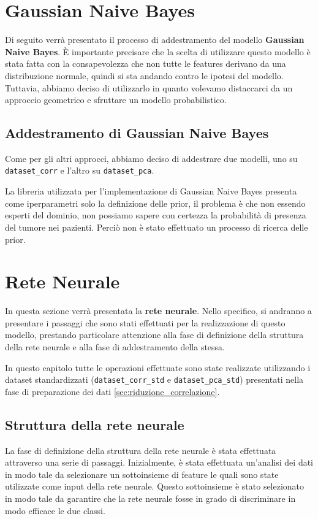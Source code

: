 \section{Gaussian Naive Bayes}
Di seguito verrà presentato il processo di addestramento del modello
\textbf{Gaussian Naive Bayes}. È importante precisare che la scelta di utilizzare
questo modello è stata fatta con la consapevolezza che non tutte le features
derivano da una distribuzione normale, quindi si sta andando contro le ipotesi 
del modello.
Tuttavia, abbiamo deciso di utilizzarlo in quanto volevamo distaccarci da un
approccio geometrico e sfruttare un modello probabilistico.
\subsection{Addestramento di Gaussian Naive Bayes}
Come per gli altri approcci, abbiamo deciso di addestrare due modelli, uno su
\texttt{dataset\_corr} e l'altro su \texttt{dataset\_pca}.

La libreria utilizzata per l'implementazione di Gaussian Naive Bayes
presenta come iperparametri solo la definizione delle prior, il problema è che non
essendo esperti del dominio, non possiamo sapere con certezza la probabilità
di presenza del tumore nei pazienti. Perciò non è stato effettuato un processo di
ricerca delle prior.
\section{Rete Neurale}
In questa sezione verrà presentata la \textbf{rete neurale}. Nello specifico, si
andranno a presentare i passaggi che sono stati effettuati per la realizzazione
di questo modello, prestando particolare attenzione alla fase di definizione
della struttura della rete neurale e alla fase di addestramento della stessa.

In questo capitolo tutte le operazioni effettuate sono state realizzate
utilizzando i dataset standardizzati (\texttt{dataset\_corr\_std} e
\texttt{dataset\_pca\_std}) presentati nella fase di preparazione dei
dati \ref{sec:riduzione_correlazione}.
\subsection{Struttura della rete neurale}
La fase di definizione della struttura della rete neurale è stata effettuata
attraverso una serie di passaggi. Inizialmente, è stata effettuata un'analisi
dei dati in modo tale da selezionare un sottoinsieme di feature le quali sono
state utilizzate come input della rete neurale. Questo sottoinsieme è stato
selezionato in modo tale da garantire che la rete neurale fosse in grado di
discriminare in modo efficace le due classi.

